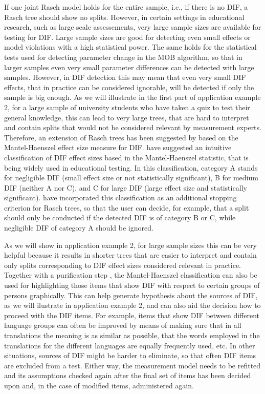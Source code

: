 \documentclass[doc,floatsintext,natbib]{apa7}
\begin{document}
If one joint Rasch model holds for the entire sample, i.e., if there is no DIF, a Rasch tree should show no splits. However, in certain settings in educational research, such as large scale assessements, very large sample sizes are available for testing for DIF. Large sample sizes are good for detecting even small effects or model violations with a high statistical power. The same holds for the statistical tests used for detecting parameter change in the MOB algorithm, so that in larger samples even very small parameter differences can be detected with large samples. However, in DIF detection this may mean that even very small DIF effects, that in practice can be considered ignorable, will be detected if only the sample is big enough. As we will illustrate in the first part of application example 2, for a large sample of university students who have taken a quiz to test their general knowledge, this can lead to very large trees, that are hard to interpret and contain splits that would not be considered relevant by measurement experts. Therefore, an extension of Rasch trees has been suggested by \citet{HennyDeba23} based on the Mantel-Haenszel effect size measure for DIF. \citet{HolTha:1985} have suggested an intuitive classification of DIF effect sizes based in the Mantel-Haenszel statistic, that is being widely used in educational testing. In this classification, category A stands for negligible DIF (small effect size or not statistically significant), B for medium DIF (neither A nor C), and C for large DIF (large effect size and statistically significant). \citet{HennyDeba23} have incorporated this classification as an additional stopping criterion for Rasch trees, so that the user can decide, for example, that a split should only be conducted if the detected DIF is of category B or C, while negligible DIF of category A should be ignored. 

As we will show in application example 2, for large sample sizes this can be very helpful because it results in shorter trees that are easier to interpret and contain only splits corresponding to DIF effect sizes considered relevant in practice. Together with a purification step \citep[see][for details]{HennyDeba23}, the Mantel-Haenszel classification can also be used for highlighting those items that show DIF with respect to certain groups of persons graphically. This can help generate hypothesis about the sources of DIF, as we will ilustrate in application example 2, and can also aid the decision how to proceed with the DIF items. 
For example, items that show DIF between different language groups can often be improved by means of making sure that in all translations the meaning is as similar as possible, that the words employed in the translations for the different languages are equally frequently used, etc. In other situations, sources of DIF might be harder to eliminate, so that often DIF items are excluded from a test. Either way, the measurement model needs to be refitted and its assumptions checked again after the final set of items has been decided upon and, in the case of modified items, administered again. 
\end{document}
